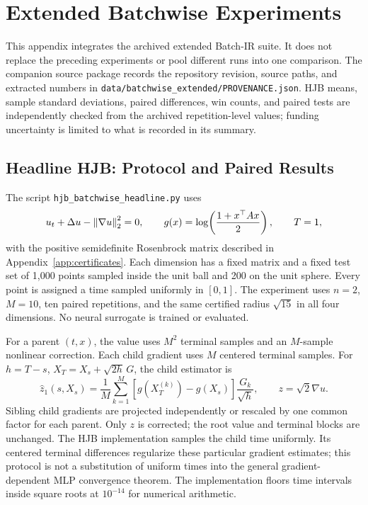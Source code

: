 \clearpage
\section{Extended Batchwise Experiments}
\label{app:extended}
This appendix integrates the archived extended Batch-IR suite. It does not replace the preceding experiments or pool different runs into one comparison. The companion source package records the repository revision, source paths, and extracted numbers in \texttt{data/batchwise\_extended/PROVENANCE.json}. HJB means, sample standard deviations, paired differences, win counts, and paired tests are independently checked from the archived repetition-level values; funding uncertainty is limited to what is recorded in its summary.

\subsection{Headline HJB: Protocol and Paired Results}
\label{app:extended-hjb}
The script \texttt{hjb\_batchwise\_headline.py} uses
\[
 u_t+\Delta u-\left\lVert \nabla u\right\rVert_2^2=0,\qquad
 g(x)=\log\!\left(\frac{1+x^\top A x}{2}\right),\qquad T=1,
\]
with the positive semidefinite Rosenbrock matrix described in Appendix~\ref{app:certificates}. Each dimension has a fixed matrix and a fixed test set of 1,000 points sampled inside the unit ball and 200 on the unit sphere. Every point is assigned a time sampled uniformly in $[0,1]$. The experiment uses $n=2$, $M=10$, ten paired repetitions, and the same certified radius $\sqrt{15}$ in all four dimensions. No neural surrogate is trained or evaluated.

For a parent $(t,x)$, the value uses $M^2$ terminal samples and an $M$-sample nonlinear correction. Each child gradient uses $M$ centered terminal samples. For $h=T-s$, $X_T=X_s+\sqrt{2h}\,G$, the child estimator is
\[
 \widehat z_1(s,X_s)=\frac1M\sum_{k=1}^M
 [g(X_T^{(k)})-g(X_s)]\frac{G_k}{\sqrt h},
 \qquad z=\sqrt2\nabla u.
\]
Sibling child gradients are projected independently or rescaled by one common factor for each parent. Only $z$ is corrected; the root value and terminal blocks are unchanged. The HJB implementation samples the child time uniformly. Its centered terminal differences regularize these particular gradient estimates; this protocol is not a substitution of uniform times into the general gradient-dependent MLP convergence theorem. The implementation floors time intervals inside square roots at $10^{-14}$ for numerical arithmetic.

